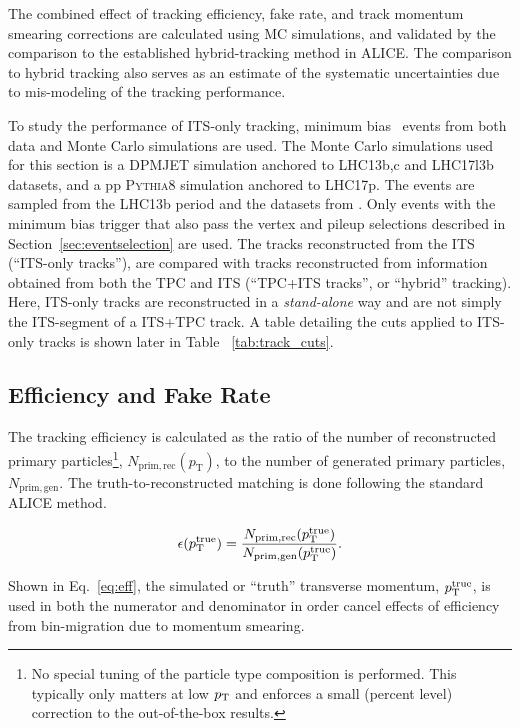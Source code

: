 The combined effect of tracking efficiency, fake rate, and track momentum smearing corrections are calculated using MC simulations, and validated by the comparison to the established hybrid-tracking method in ALICE. The comparison to hybrid tracking also serves as an estimate of the systematic uncertainties due to mis-modeling of the tracking performance.

To study the performance of ITS-only tracking, minimum bias \pPb~events from both data and Monte Carlo simulations are used. The Monte Carlo simulations used for this section is a \textsc{DPMJET} simulation anchored to LHC13b,c and LHC17l3b datasets, and a pp \textsc{Pythia8} simulation anchored to LHC17p. The events are sampled from the LHC13b period and the datasets from \cite{Acharya:2018qsh}. Only events with the minimum bias trigger that also pass the vertex and pileup selections described in Section~\ref{sec:eventselection} are used. The tracks reconstructed from the ITS (``ITS-only tracks''), are compared with tracks reconstructed from information obtained from both the TPC and ITS (``TPC+ITS tracks'', or ``hybrid'' tracking). Here, ITS-only tracks are reconstructed in a \textit{stand-alone} way and are not simply the ITS-segment of a ITS+TPC track. A table detailing the cuts applied to ITS-only tracks is shown later in Table ~\ref{tab:track_cuts}.


\subsection{Efficiency and Fake Rate}
\label{sec:Efficiency_fake_rates}
The tracking efficiency is calculated as the ratio of the number of reconstructed primary particles\footnote{No special tuning of the particle type composition is performed. This typically only matters at low $p_{\mathrm{T}}$ and enforces a small (percent level) correction to the out-of-the-box results.}, $N_{\mathrm{prim,rec}}(p_\mathrm{T})$, to the number of generated primary particles, $N_{\mathrm{prim,gen}}$. The truth-to-reconstructed matching is done following the standard ALICE method.

\begin{equation}\label{eq:eff}
\epsilon (p_{\mathrm{T}}^{\mathrm{true}}) = \frac{N_{\mathrm{prim,rec}}(p_{\mathrm{T}}^{\mathrm{true}})}{N_{\mathrm{prim,gen}}(p_{\mathrm{T}}^{\mathrm{true}})}.
\end{equation}

Shown in Eq.~\ref{eq:eff}, the simulated or ``truth'' transverse momentum, $p_{\mathrm{T}}^{\mathrm{true}}$, is used in both the numerator and denominator in order cancel effects of efficiency from bin-migration due to momentum smearing.


